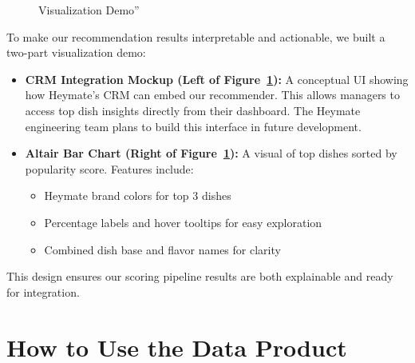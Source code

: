 \documentclass[
  11pt,
  a4paper,
  DIV=11,
  numbers=noendperiod]{scrartcl}
\providecommand{\tightlist}{%
  \setlength{\itemsep}{0pt}\setlength{\parskip}{0pt}}\usepackage{longtable,booktabs,array}
\begin{document}
\begin{figure}

\caption{\label{fig-viz-demo}Visualization Demo''}


\end{figure}%

To make our recommendation results interpretable and actionable, we
built a two-part visualization demo:

\begin{itemize}
\tightlist
\item
  \textbf{CRM Integration Mockup (Left of Figure~\ref{fig-viz-demo}):} A
  conceptual UI showing how Heymate's CRM can embed our recommender.
  This allows managers to access top dish insights directly from their
  dashboard. The Heymate engineering team plans to build this interface
  in future development.
\item
  \textbf{Altair Bar Chart (Right of Figure~\ref{fig-viz-demo}):} A
  visual of top dishes sorted by popularity score. Features include:

  \begin{itemize}
  \tightlist
  \item
    Heymate brand colors for top 3 dishes
  \item
    Percentage labels and hover tooltips for easy exploration
  \item
    Combined dish base and flavor names for clarity
  \end{itemize}
\end{itemize}

This design ensures our scoring pipeline results are both explainable
and ready for integration.

\section{How to Use the Data Product}\label{how-to-use-the-data-product}
\end{document}
